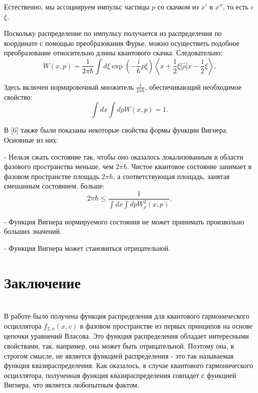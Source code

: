 \documentclass[a4paper,14pt]{article}
\begin{document}
Естественно, мы ассоциируем импульс частицы $p$ со скачком из $x'$ в $x''$, то есть c $\xi$.

Поскольку распределение по импульсу получается из распределения по координате с помощью преобразования Фурье, можно осуществить подобное преобразование относительно  длины квантового скачка. Следовательно:
\begin{equation}
W(x, p)=\frac{1}{2 \pi \hbar} \int d \xi \exp \left(-\frac{i}{\hbar} p \xi\right)\left\langle x+\frac{1}{2} \xi|\widehat{\rho}| x-\frac{1}{2} \xi\right\rangle.
\end{equation}

Здесь включен нормировочный множитель $\frac{1}{2 \pi \hbar}$, обеспечивающий необходимое свойство:
\begin{equation}
\int d x \int d p W(x, p)=1.
\end{equation}

В [6]  также были показаны некоторые свойства формы функции Вигнера. Основные из них:

- Нельзя сжать состояние так, чтобы оно оказалось локализованным в области фазового пространства меньше, чем $2\pi\hbar$. Чистое квантовое состояние занимает в фазовом пространстве площадь $2\pi\hbar$, а соответствующая площадь, занятая смешанным состоянием, больше:
\begin{equation}
2 \pi \hbar \leqslant \frac{1}{\int d x \int d p W_{\rho}^{2}(x, p)}.
\end{equation}

- Функция Вигнера нормируемого состояния не может принимать произвольно больших значений.

- Функция Вигнера может становиться отрицательной.
\newpage
\section{Заключение}
~\\

В работе было получена функция распределения для квантового гармонического осциллятора $f_{2,n}(x,v)$ в фазовом пространстве из первых принципов на основе цепочки уравнений Власова. Это функция распределения обладает интересными свойствами, так, например, она может быть отрицательной. Поэтому она, в строгом смысле, не является функцией распределения - это так называемая функция квазираспределения. Как оказалось, в случае квантового гармонического осциллятора, полученная функция квазираспределения совпадет с функцией Вигнера, что является любопытным фактом. 
\end{document}
